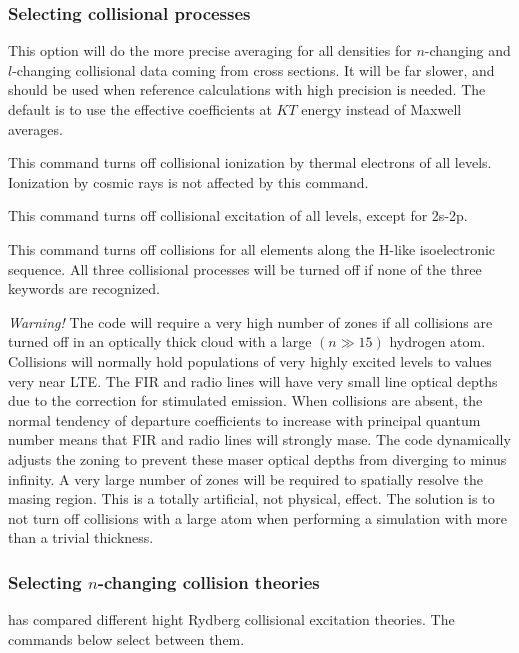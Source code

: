 \subsubsection{Selecting collisional processes}


 This option will do the more
precise averaging for all densities for $n$-changing and $l$-changing
collisional data coming from cross sections. It will
be far slower, and should be used when reference calculations with high
precision is needed.  The default is to use the effective coefficients at $KT$
energy instead of Maxwell averages. 

This command turns off collisional
ionization by thermal electrons of all levels.
Ionization by
cosmic rays is not affected by this command.

This command turns off collisional
excitation of all levels, except for 2s-2p.

This command turns off collisions for all elements along the H-like
isoelectronic sequence.
All three collisional processes will be turned
off if none of the three keywords are recognized.

\emph{Warning!}  The code will require a very high number of zones
if all collisions
are turned off in an optically thick cloud with a large
$(n \gg 15)$ hydrogen atom.
Collisions will normally hold populations of very highly excited
levels to values very near LTE.
The FIR and radio lines will have very
small line optical depths due to the correction for stimulated emission.
When collisions are absent, the normal tendency of departure coefficients
to increase with principal quantum number means that FIR and radio lines
will strongly mase.
The code dynamically adjusts the zoning to prevent
these maser optical depths from diverging to minus infinity.
A very large
number of zones will be required to spatially resolve the masing region.
This is a totally artificial, not physical, effect.
The solution is to
not turn off collisions with a large atom when performing a
simulation with more than a trivial thickness.

\subsubsection{Selecting $n$-changing collision theories}

\citet{Guzman.III.2019} has compared different hight Rydberg collisional excitation 
theories. The commands below select between them.

